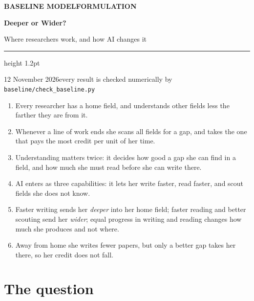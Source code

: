 \documentclass[11pt,letterpaper]{article}
\begin{document}
\thispagestyle{plain}
{\sffamily\bfseries\small\color{hblue}BASELINE MODEL\enspace\textperiodcentered\enspace FORMULATION\par}
\vspace{4pt}
{\sffamily\bfseries\fontsize{28}{32}\selectfont\color{hbluedark}Deeper or Wider?\par}
\vspace{5pt}
{\sffamily\large\color{inktwo}Where researchers work, and how AI changes it\par}
\vspace{9pt}
{\color{hblue}\hrule height 1.2pt}
\vspace{7pt}
{\sffamily\small\color{muted}12 November 2026\enspace\textperiodcentered\enspace every result is checked numerically by \texttt{baseline/check\_baseline.py}\par}
\vspace{2pt}

\begin{keybox}
\begin{enumerate}[leftmargin=1.5em,itemsep=1pt]
\item Every researcher has a home field, and understands other fields less the farther they are from it.
\item Whenever a line of work ends she scans all fields for a gap, and takes the one that pays the most credit per unit of her time.
\item Understanding matters twice: it decides how good a gap she can find in a field, and how much she must read before she can write there.
\item AI enters as three capabilities: it lets her write faster, read faster, and scout fields she does not know.
\item Faster writing sends her \emph{deeper} into her home field; faster reading and better scouting send her \emph{wider}; equal progress in writing and reading changes how much she produces and not where.
\item Away from home she writes fewer papers, but only a better gap takes her there, so her credit does not fall.
\end{enumerate}
\end{keybox}

\section{The question}\label{sec:question}
\end{document}
